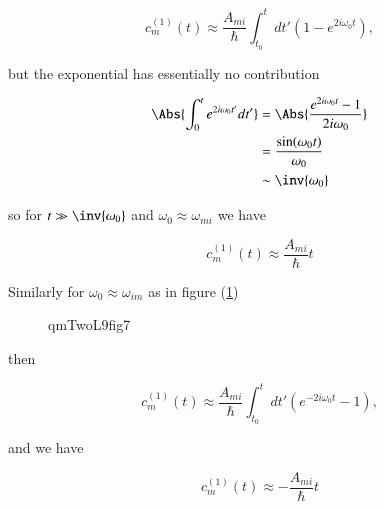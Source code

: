 \begin{equation}\label{eqn:qmTwoL9:550}
c_m^{(1)}(t) \approx
\frac{A_{mi}}{\hbar} \int_{t_0}^t dt' 
\left( 
1
-e^{2 i \omega_0 t }
\right),
\end{equation}

but the exponential has essentially no contribution

\begin{align*}
\Abs{\int_0^t e^{2 i \omega_0 t'} dt' } 
&= 
\Abs{\frac{e^{2 i \omega_0 t} -1 }{2 i \omega_0}}  \\
&= 
\frac{\sin(\omega_0 t)}{\omega_0} \\
&\sim \inv{\omega_0}
\end{align*}

so for $t \gg \inv{\omega_0}$ and $\omega_0 \approx \omega_{mi}$ we have 

\begin{equation}\label{eqn:qmTwoL9:570}
c_m^{(1)}(t) \approx \frac{A_{mi}}{\hbar} t
\end{equation}

Similarly for $\omega_0 \approx \omega_{im}$ as in figure (\ref{fig:qmTwoL9:7}) 

\begin{figure}[htp]
   \centering
   \def\svgwidth{0.3\columnwidth}
   
   \caption{qmTwoL9fig7}\label{fig:qmTwoL9:7}
\end{figure}

then

\begin{equation}\label{eqn:qmTwoL9:590}
c_m^{(1)}(t) \approx
\frac{A_{mi}}{\hbar} \int_{t_0}^t dt' 
\left( 
e^{-2 i \omega_0 t }
-1
\right),
\end{equation}

and we have

\begin{equation}\label{eqn:qmTwoL9:610}
c_m^{(1)}(t) \approx -\frac{A_{mi}}{\hbar} t
\end{equation}

\EndArticle

